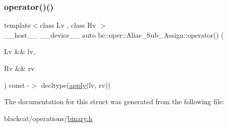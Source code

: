 \mbox{\label{structbc_1_1oper_1_1Alias__Sub__Assign_a72b32c4a8603270cbe64995b2b4a4b58}} 
\subsubsection{\texorpdfstring{operator()()}{operator()()}}
{\footnotesize\ttfamily template$<$class Lv , class Rv $>$ \\
\+\_\+\+\_\+host\+\_\+\+\_\+ \+\_\+\+\_\+device\+\_\+\+\_\+ auto bc\+::oper\+::\+Alias\+\_\+\+Sub\+\_\+\+Assign\+::operator() (\begin{DoxyParamCaption}\item[{Lv \&\&}]{lv,  }\item[{Rv \&\&}]{rv }\end{DoxyParamCaption}) const -\/$>$ decltype(\hyperlink{structbc_1_1oper_1_1Alias__Sub__Assign_a65827a9261b00d81d8724e623309f380}{apply}(lv, rv)) \hspace{0.3cm}{\ttfamily [inline]}}



The documentation for this struct was generated from the following file\+:\begin{DoxyCompactItemize}
\item 
blackcat/operations/\hyperlink{binary_8h}{binary.\+h}\end{DoxyCompactItemize}
